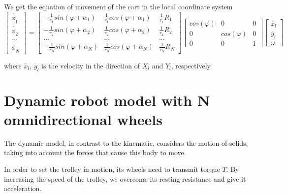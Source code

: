 \documentclass[oneside,final,14pt]{extreport}
\begin{document}
We get the equation of movement of the cart in the local coordinate system
\begin{equation}
\begin{bmatrix}
\dot{\phi_{1}} \\
\dot{\phi_{2}} \\
... \\
\dot{\phi_{N}}
\end{bmatrix}
=
\begin{bmatrix}
- \frac{1}{r_{1}} sin (\varphi + \alpha_{1}) &
\frac{1}{r_{1}} cos (\varphi + \alpha_{1}) &
\frac{1}{r_{1}} R_{1}
\\
- \frac{1}{r_{2}} sin (\varphi + \alpha_{2}) &
\frac{1}{r_{2}} cos (\varphi + \alpha_{2}) &
\frac{1}{r_{2}} R_{2}
\\
... & ... & ...
\\
- \frac{1}{r_{N}} sin (\varphi + \alpha_{N}) &
\frac{1}{r_{N}} cos (\varphi + \alpha_{N}) &
\frac{1}{r_{N}} R_{N}
\end{bmatrix}
\begin{bmatrix}
cos (\varphi) & 0 & 0 \\
0 & cos (\varphi) & 0 \\
0 & 0 & 1
\end{bmatrix}
\begin{bmatrix}
\dot{x_{l}} \\
\dot{y_{l}} \\
\omega
\end{bmatrix}
\end{equation}

where $ \dot{x_{l}} $, $ \dot{y_{l}} $ is the velocity in the direction of $ X_{l} $ and $ Y_{l} $, respectively.


\chapter{Dynamic robot model with N omnidirectional wheels}
The dynamic model, in contrast to the kinematic, considers the motion of solids, taking into account the forces that cause this body to move.
 
In order to set the trolley in motion, its wheels need to transmit torque $ T $. By increasing the speed of the trolley, we overcome its resting resistance and give it acceleration.
 
\end{document}
